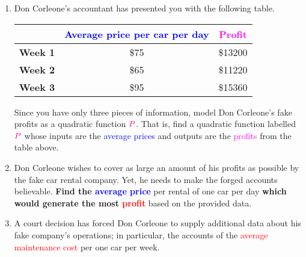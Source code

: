 \documentclass[a4paper,11pt]{article}
\newcommand{\clr}{\textcolor{red}}
\newcommand{\clb}{\textcolor{blue}}
\newcommand{\clm}{\textcolor{magenta}}
\begin{document}
\begin{enumerate}
 \item Don Corleone's accountant has presented you with the following table.
  \begin{table}[h]
   \renewcommand{\arraystretch}{1.3}
   \centering
   \begin{tabular}{c|cc}
    & \textbf{\clb{Average price per car per day}} & \textbf{\clm{Profit}} \\
    \toprule
    \textbf{Week 1} & \$75 & \$13200\\
    \textbf{Week 2} & \$65 & \$11220\\
    \textbf{Week 3} & \$95 & \$15360
   \end{tabular}
  \end{table}
 
  Since you have only three pieces of information, model Don Corleone's fake
  profits as a quadratic function $\clm{P}$. That is, find a quadratic function
  labelled $\clm{P}$ whose inputs are the \clb{average prices} and outputs are
  the \clm{profits} from the table above.
 \item Don Corleone wishes to cover as large an amount of his profits as
  possible by the fake car rental company. Yet, he needs to make the forged
  accounts believable. \textbf{Find the \clb{average price}} per rental of one
  car per day \textbf{which would generate the most \clr{profit}} based on the
  provided data.
 \item A court decision has forced Don Corleone to supply additional data about
  his fake company's operations; in particular, the accounts of the \clr{average
  maintenance cost} per one car per week.
 

\end{enumerate}
\end{document}
